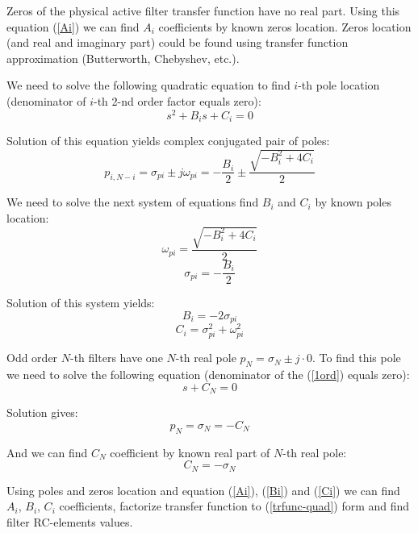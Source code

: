 Zeros of the physical active filter transfer function have no real part.
Using this equation (\ref{Ai}) we can find $A_i$ coefficients by known zeros
location. Zeros location (and real and imaginary part) could be found using
transfer function approximation (Butterworth, Chebyshev, etc.).

We need to solve the following quadratic equation to find $i$-th pole location
(denominator of $i$-th 2-nd order factor equals zero):
\begin{equation}
 s^2+B_is + C_i = 0
\end{equation}

Solution of this equation yields complex conjugated pair of poles:
\begin{equation}
 p_{i,N-i}=\sigma_{pi}\pm
j\omega_{pi}=-\frac{B_i}{2}\pm\frac{\sqrt{-B_i^2+4C_i}}{2}
\label{pole_from_quad}
\end{equation}

We need to solve the next system of equations find $B_i$ and $C_i$ by known
poles location:
\begin{equation}
 \omega_{pi}=\frac{\sqrt{-B_i^2+4C_i}}{2}
\end{equation}
\begin{equation}
 \sigma_{pi}=-\frac{B_i}{2}
\end{equation}

Solution of this system yields:
\begin{equation}
 B_i=-2\sigma_{pi} \label{Bi}
\end{equation}
\begin{equation}
 C_i=\sigma_{pi}^2+\omega_{pi}^2 \label{Ci}
\end{equation}

Odd order $N$-th filters have one $N$-th real pole $p_N=\sigma_{N}\pm j\cdot0$.
To find this pole we need to solve the following equation (denominator of the
(\ref{1ord}) equals zero):
\begin{equation}
 s+C_N=0
\end{equation}

Solution gives:
\begin{equation}
 p_N =\sigma_N = -C_N
\end{equation}

And we can find $C_N$ coefficient by known real part of $N$-th real pole:
\begin{equation}
 C_N=-\sigma_N \label{CN-1ord}
\end{equation}

Using poles and zeros location and equation (\ref{Ai}), (\ref{Bi}) and
(\ref{Ci}) we can find $A_i$, $B_i$, $C_i$ coefficients, factorize transfer
function to (\ref{trfunc-quad}) form and find filter RC-elements values.

